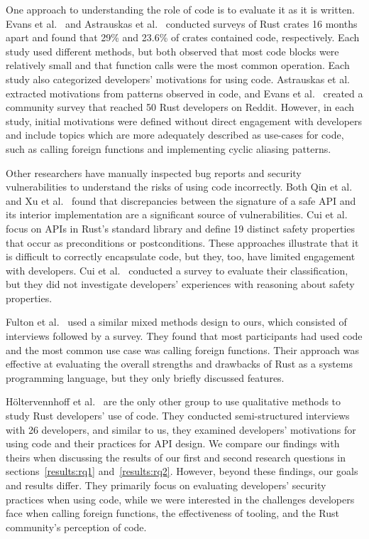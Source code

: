 One approach to understanding the role of \unsafe code is to evaluate it as it is written. Evans et al.~\cite{evans20} and Astrauskas et al.~\cite{astrauskas20} conducted surveys of Rust crates 16 months apart and found that 29\% and 23.6\% of crates contained \unsafe code, respectively. Each study used different methods, but both observed that most \unsafe code blocks were relatively small and that \unsafe function calls were the most common \unsafe operation. Each study also categorized developers' motivations for using \unsafe code. Astrauskas et al.~\cite{astrauskas20} extracted motivations from patterns observed in code, and Evans et al.~\cite{evans20} created a community survey that reached 50 Rust developers on Reddit. However, in each study, initial motivations were defined without direct engagement with developers and include topics which are more adequately described as use-cases for \unsafe code, such as calling foreign functions and implementing cyclic aliasing patterns.

Other researchers have manually inspected bug reports and security vulnerabilities to understand the risks of using \unsafe code incorrectly. Both Qin et al.~\cite{qin20} and Xu et al.~\cite{xu2021} found that discrepancies between the signature of a safe API and its interior \unsafe implementation are a significant source of vulnerabilities. Cui et al.~\cite{cui23} focus on \unsafe APIs in Rust's standard library and define 19 distinct safety properties that occur as preconditions or postconditions. These approaches illustrate that it is difficult to correctly encapsulate \unsafe code, but they, too, have limited engagement with developers. Cui et al.~\cite{cui23} conducted a survey to evaluate their classification, but they did not investigate developers' experiences with reasoning about safety properties.

Fulton et al.~\cite{fulton21} used a similar mixed methods design to ours, which consisted of interviews followed by a survey. They found that most participants had used \unsafe code and the most common use case was calling foreign functions. Their approach was effective at evaluating the overall strengths and drawbacks of Rust as a systems programming language, but they only briefly discussed \unsafe features. 
 
Höltervennhoff et al.~\cite{holtervennhoff23} are the only other group to use qualitative methods to study Rust developers' use of \unsafe code. They conducted semi-structured interviews with 26 developers, and similar to us, they examined developers' motivations for using \unsafe code and their practices for API design. We compare our findings with theirs when discussing the results of our first and second research questions in sections~\ref{results:rq1} and~\ref{results:rq2}. However, beyond these findings, our goals and results differ. They primarily focus  on evaluating developers' security practices when using \unsafe code, while we were interested in the challenges developers face when calling foreign functions, the effectiveness of tooling, and the Rust community's perception of \unsafe code.


